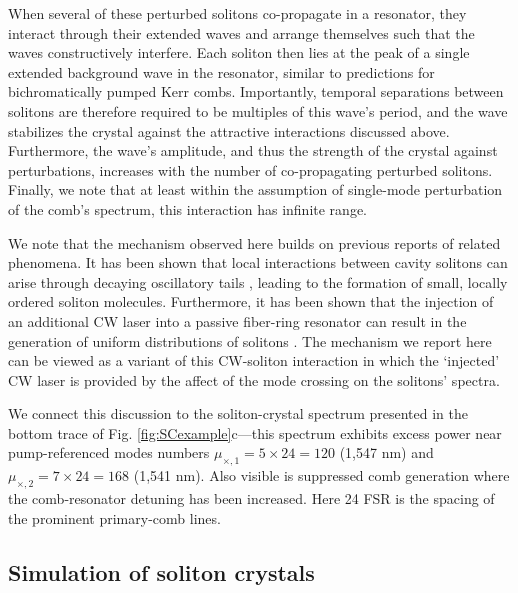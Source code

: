 When several of these perturbed solitons co-propagate in a resonator, they interact through their extended waves and arrange themselves such that the waves constructively interfere. Each soliton then lies at the peak of a single extended background wave in the resonator, similar to predictions for bichromatically pumped Kerr combs\cite{38}. Importantly, temporal separations between solitons are therefore required to be multiples of this wave's period, and the wave stabilizes the crystal against the attractive interactions discussed above. Furthermore, the wave's amplitude, and thus the strength of the crystal against perturbations, increases with the number of co-propagating perturbed solitons. Finally, we note that at least within the assumption of single-mode perturbation of the comb's spectrum, this interaction has infinite range. 

We note that the mechanism observed here builds on previous reports of related phenomena. It has been shown that local interactions between cavity solitons can arise through decaying oscillatory tails \cite{39}, leading to the formation of small, locally ordered soliton molecules. Furthermore, it has been shown that the injection of an additional CW laser into a passive fiber-ring resonator can result in the generation of uniform distributions of solitons \cite{40}. The mechanism we report here can be viewed as a variant of this CW-soliton interaction in which the `injected' CW laser is provided by the affect of the mode crossing on the solitons' spectra.

We connect this discussion to the soliton-crystal spectrum presented in the bottom trace of Fig. \ref{fig:SCexample}c---this spectrum exhibits excess power near pump-referenced modes numbers $\mu_{\times,1}=5\times24=120$ (1,547 nm) and $\mu_{\times,2}=7\times24=168$  (1,541 nm). Also visible is suppressed comb generation where the comb-resonator detuning has been increased. Here 24 FSR is the spacing of the prominent primary-comb lines. 

\subsection{Simulation of soliton crystals}

